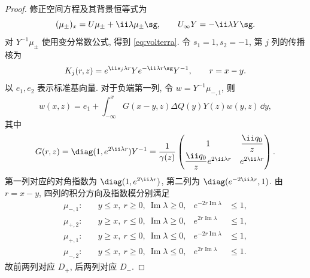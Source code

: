 \begin{proof}
修正空间方程及其背景恒等式为
\[
(\mu_\pm)_x=U\mu_\pm+\ii\lambda\mu_\pm\sg,\qquad U_\infty Y=-\ii\lambda Y\sg.
\]
对 $Y^{-1}\mu_\pm$ 使用变分常数公式, 得到 \eqref{eq:volterra}. 令 $s_1=1,s_2=-1$, 第 $j$ 列的传播核为
\begin{equation}\label{eq:columnkernel}
K_j(r,z)=e^{\ii s_j\lambda r}Y e^{-\ii\lambda r\sg}Y^{-1},\qquad r=x-y.
\end{equation}
以 $e_1,e_2$ 表示标准基向量. 对于负端第一列, 令 $w=Y^{-1}\mu_{-,1}$, 则
\begin{equation}\label{eq:jost-column-volterra}
w(x,z)=e_1+\int_{-\infty}^{x}G(x-y,z)\Delta Q(y)Y(z)w(y,z)\,\dd y,
\end{equation}
其中
\begin{equation}\label{eq:jost-Gkernel}
G(r,z)=\diag(1,e^{2\ii\lambda r})Y^{-1}
=\dfrac{1}{\gamma(z)}
\begin{pmatrix}
1&\dfrac{\ii q_0}{z}\\[4pt]
\dfrac{\ii q_0}{z}e^{2\ii\lambda r}&e^{2\ii\lambda r}
\end{pmatrix}.
\end{equation}
第一列对应的对角指数为 $\diag(1,e^{2\ii\lambda r})$, 第二列为 $\diag(e^{-2\ii\lambda r},1)$. 由 $r=x-y$, 四列的积分方向及指数模分别满足
\begin{align*}
\mu_{-,1}:&\quad y\le x,\ r\ge0,\ \operatorname{Im}\lambda\ge0,
& e^{-2r\operatorname{Im}\lambda}&\le1,\\
\mu_{+,2}:&\quad y\ge x,\ r\le0,\ \operatorname{Im}\lambda\ge0,
& e^{2r\operatorname{Im}\lambda}&\le1,\\
\mu_{+,1}:&\quad y\ge x,\ r\le0,\ \operatorname{Im}\lambda\le0,
& e^{-2r\operatorname{Im}\lambda}&\le1,\\
\mu_{-,2}:&\quad y\le x,\ r\ge0,\ \operatorname{Im}\lambda\le0,
& e^{2r\operatorname{Im}\lambda}&\le1.
\end{align*}
故前两列对应 $D_+$, 后两列对应 $D_-$.


\end{proof}

